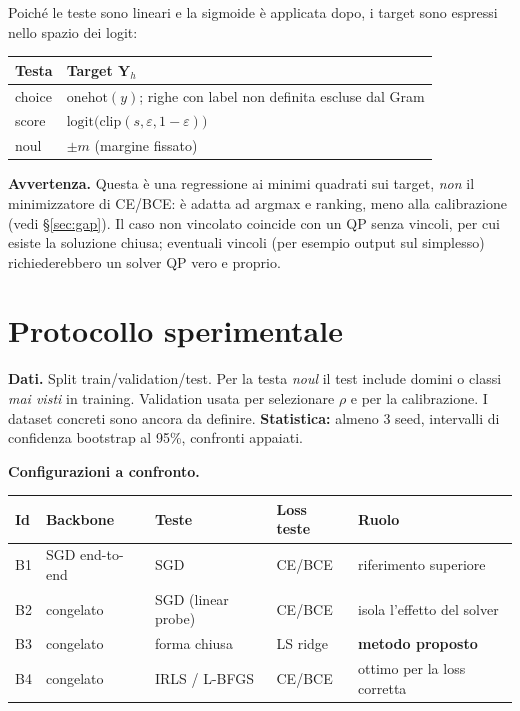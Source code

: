 \documentclass[11pt,a4paper]{article}
\newcommand{\Y}{\bm{Y}}
\begin{document}
Poiché le teste sono lineari e la sigmoide è applicata dopo, i target sono espressi nello spazio dei logit:

\begin{center}
\begin{tabularx}{\textwidth}{lL}
\toprule
\textbf{Testa} & \textbf{Target $\Y_h$} \\
\midrule
choice & $\mathrm{onehot}(y)$; righe con label non definita escluse dal Gram \\
score  & $\mathrm{logit}\big(\mathrm{clip}(s,\varepsilon,1-\varepsilon)\big)$ \\
noul   & $\pm m$ (margine fissato) \\
\bottomrule
\end{tabularx}
\end{center}

\textbf{Avvertenza.} Questa è una regressione ai minimi quadrati sui target, \emph{non} il minimizzatore di CE/BCE: è adatta ad argmax e ranking, meno alla calibrazione (vedi \S\ref{sec:gap}). Il caso non vincolato coincide con un QP senza vincoli, per cui esiste la soluzione chiusa; eventuali vincoli (per esempio output sul simplesso) richiederebbero un solver QP vero e proprio.

\section{Protocollo sperimentale}

\textbf{Dati.} Split train/validation/test. Per la testa \emph{noul} il test include domini o classi \emph{mai visti} in training. Validation usata per selezionare $\rho$ e per la calibrazione. I dataset concreti sono ancora da definire. \textbf{Statistica:} almeno 3 seed, intervalli di confidenza bootstrap al 95\%, confronti appaiati.

\textbf{Configurazioni a confronto.}
\begin{center}
\begin{tabularx}{\textwidth}{llllL}
\toprule
\textbf{Id} & \textbf{Backbone} & \textbf{Teste} & \textbf{Loss teste} & \textbf{Ruolo} \\
\midrule
B1 & SGD end-to-end & SGD & CE/BCE & riferimento superiore \\
B2 & congelato & SGD (linear probe) & CE/BCE & isola l'effetto del solver \\
B3 & congelato & forma chiusa & LS ridge & \textbf{metodo proposto} \\
B4 & congelato & IRLS / L-BFGS & CE/BCE & ottimo per la loss corretta \\
\bottomrule
\end{tabularx}
\end{center}
\end{document}
